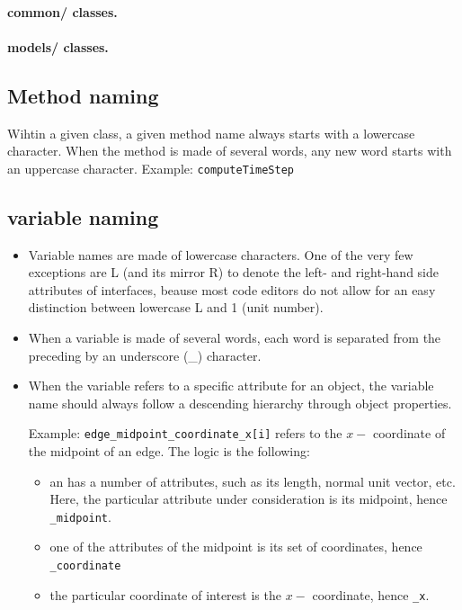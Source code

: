 %
%
\paragraph{common/ classes.}

%
%
\paragraph{models/ classes.}

%
%
%
\subsection{Method naming}
Wihtin a given class, a given method name always starts with a lowercase character. When the method is made of several words, any new word starts with an uppercase character. Example:
\texttt{computeTimeStep}
%
%
%
\subsection{variable naming}
\begin{itemize}
\item Variable names are made of lowercase characters. One of the very few exceptions are L (and its mirror R) to denote the left- and right-hand side attributes of interfaces, beause most code editors do not allow for an easy distinction between lowercase L and 1 (unit number).
\item When a variable is made of several words, each word is separated from the preceding by an underscore (\_) character.
\item When the variable refers to a specific attribute for an object, the variable name should always follow a descending hierarchy through object properties. 

Example:
\texttt{edge\_midpoint\_coordinate\_x[i]} refers to the $x-$ coordinate of the midpoint of an edge. The logic is the following:
\begin{itemize}
\item an  has a number of attributes, such as its length, normal unit vector, etc. Here, the particular attribute under consideration is its midpoint, hence \texttt{\_midpoint}.
\item one of the attributes of the midpoint is its set of coordinates, hence \texttt{\_coordinate}
\item the particular coordinate of interest is the $x-$ coordinate, hence \texttt{\_x}.
\end{itemize}
\end{itemize}

